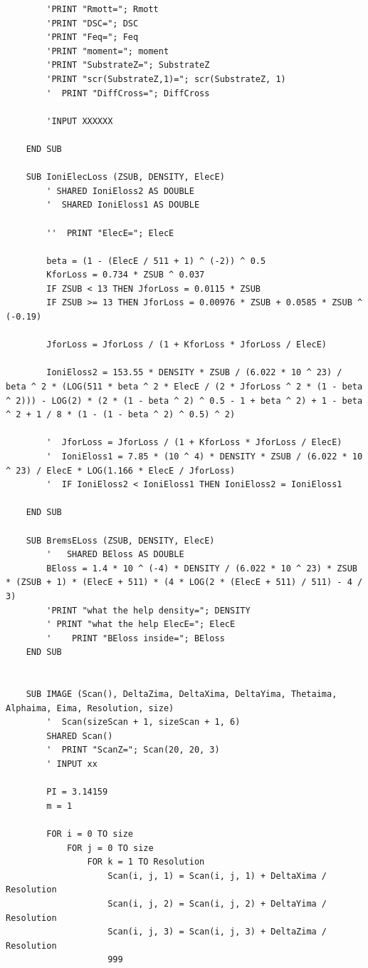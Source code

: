 \documentclass[10pt, reqno]{exam}
\begin{document}
\begin{verbatim}
        'PRINT "Rmott="; Rmott
        'PRINT "DSC="; DSC
        'PRINT "Feq="; Feq
        'PRINT "moment="; moment
        'PRINT "SubstrateZ="; SubstrateZ
        'PRINT "scr(SubstrateZ,1)="; scr(SubstrateZ, 1)
        '  PRINT "DiffCross="; DiffCross
    
        'INPUT XXXXXX
    
    END SUB
    
    SUB IoniElecLoss (ZSUB, DENSITY, ElecE)
        ' SHARED IoniEloss2 AS DOUBLE
        '  SHARED IoniEloss1 AS DOUBLE
    
        ''  PRINT "ElecE="; ElecE
    
        beta = (1 - (ElecE / 511 + 1) ^ (-2)) ^ 0.5
        KforLoss = 0.734 * ZSUB ^ 0.037
        IF ZSUB < 13 THEN JforLoss = 0.0115 * ZSUB
        IF ZSUB >= 13 THEN JforLoss = 0.00976 * ZSUB + 0.0585 * ZSUB ^ (-0.19)
    
        JforLoss = JforLoss / (1 + KforLoss * JforLoss / ElecE)
    
        IoniEloss2 = 153.55 * DENSITY * ZSUB / (6.022 * 10 ^ 23) / beta ^ 2 * (LOG(511 * beta ^ 2 * ElecE / (2 * JforLoss ^ 2 * (1 - beta ^ 2))) - LOG(2) * (2 * (1 - beta ^ 2) ^ 0.5 - 1 + beta ^ 2) + 1 - beta ^ 2 + 1 / 8 * (1 - (1 - beta ^ 2) ^ 0.5) ^ 2)
    
        '  JforLoss = JforLoss / (1 + KforLoss * JforLoss / ElecE)
        '  IoniEloss1 = 7.85 * (10 ^ 4) * DENSITY * ZSUB / (6.022 * 10 ^ 23) / ElecE * LOG(1.166 * ElecE / JforLoss)
        '  IF IoniEloss2 < IoniEloss1 THEN IoniEloss2 = IoniEloss1
    
    END SUB
    
    SUB BremsELoss (ZSUB, DENSITY, ElecE)
        '   SHARED BEloss AS DOUBLE
        BEloss = 1.4 * 10 ^ (-4) * DENSITY / (6.022 * 10 ^ 23) * ZSUB * (ZSUB + 1) * (ElecE + 511) * (4 * LOG(2 * (ElecE + 511) / 511) - 4 / 3)
        'PRINT "what the help density="; DENSITY
        ' PRINT "what the help ElecE="; ElecE
        '    PRINT "BEloss inside="; BEloss
    END SUB
    
    
    SUB IMAGE (Scan(), DeltaZima, DeltaXima, DeltaYima, Thetaima, Alphaima, Eima, Resolution, size)
        '  Scan(sizeScan + 1, sizeScan + 1, 6)
        SHARED Scan()
        '  PRINT "ScanZ="; Scan(20, 20, 3)
        ' INPUT xx
    
        PI = 3.14159
        m = 1
    
        FOR i = 0 TO size
            FOR j = 0 TO size
                FOR k = 1 TO Resolution
                    Scan(i, j, 1) = Scan(i, j, 1) + DeltaXima / Resolution
                    Scan(i, j, 2) = Scan(i, j, 2) + DeltaYima / Resolution
                    Scan(i, j, 3) = Scan(i, j, 3) + DeltaZima / Resolution
                    999
    

\end{verbatim}
\end{document}
